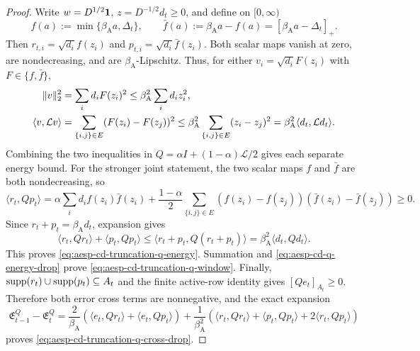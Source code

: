 \begin{proof}
Write $w=D^{1/2}\mathbf{1}$, $z=D^{-1/2}d_t\geq0$, and define on
$[0,\infty)$
\begin{equation*}
 f(a):=\min\{\beta_{\mathrm A}a,\Delta_t\},
 \qquad
 \bar f(a):=\beta_{\mathrm A}a-f(a)
             =[\beta_{\mathrm A}a-\Delta_t]_+.
\end{equation*}
Then $r_{t,i}=\sqrt{d_i}f(z_i)$ and
$p_{t,i}=\sqrt{d_i}\bar f(z_i)$.  Both scalar maps vanish at zero, are
nondecreasing, and are $\beta_{\mathrm A}$-Lipschitz.  Thus, for either
$v_i=\sqrt{d_i}F(z_i)$ with $F\in\{f,\bar f\}$,
\begin{align*}
 \lVert v\rVert_2^2
 &=\sum_i d_iF(z_i)^2
 \leq\beta_{\mathrm A}^2\sum_i d_iz_i^2,
 \\
 \langle v,\mathcal Lv\rangle
 &=\sum_{\{i,j\}\in E}(F(z_i)-F(z_j))^2
 \leq\beta_{\mathrm A}^2
       \sum_{\{i,j\}\in E}(z_i-z_j)^2
 =\beta_{\mathrm A}^2\langle d_t,\mathcal Ld_t\rangle.
\end{align*}
Combining the two inequalities in
$Q=\alpha I+(1-\alpha)\mathcal L/2$ gives each separate energy bound.  For
the stronger joint statement, the two scalar maps $f$ and $\bar f$ are both
nondecreasing, so
\begin{equation*}
 \langle r_t,Qp_t\rangle
 =\alpha\sum_i d_i f(z_i)\bar f(z_i)
 +\frac{1-\alpha}{2}\sum_{\{i,j\}\in E}
   (f(z_i)-f(z_j))(\bar f(z_i)-\bar f(z_j))\geq0.
\end{equation*}
Since $r_t+p_t=\beta_{\mathrm A}d_t$, expansion gives
\begin{equation*}
 \langle r_t,Qr_t\rangle+\langle p_t,Qp_t\rangle
 \leq\langle r_t+p_t,Q(r_t+p_t)\rangle
 =\beta_{\mathrm A}^2\langle d_t,Qd_t\rangle.
\end{equation*}
This proves \cref{eq:aesp-cd-truncation-q-energy}.  Summation and
\cref{eq:aesp-cd-q-energy-drop} prove
\cref{eq:aesp-cd-truncation-q-window}.  Finally,
$\operatorname{supp}(r_t)\cup\operatorname{supp}(p_t)\subseteq A_t$ and the finite active-row identity
gives $[Qe_t]_{A_t}\geq0$.  Therefore both error cross terms are nonnegative,
and the exact expansion
\begin{equation*}
 \mathfrak E_{t-1}^Q-\mathfrak E_t^Q
 =\frac2{\beta_{\mathrm A}}
   (\langle e_t,Qr_t\rangle+\langle e_t,Qp_t\rangle)
  +\frac1{\beta_{\mathrm A}^2}
   \left(\langle r_t,Qr_t\rangle+\langle p_t,Qp_t\rangle
          +2\langle r_t,Qp_t\rangle\right)
\end{equation*}
proves \cref{eq:aesp-cd-truncation-q-cross-drop}.
\end{proof}


